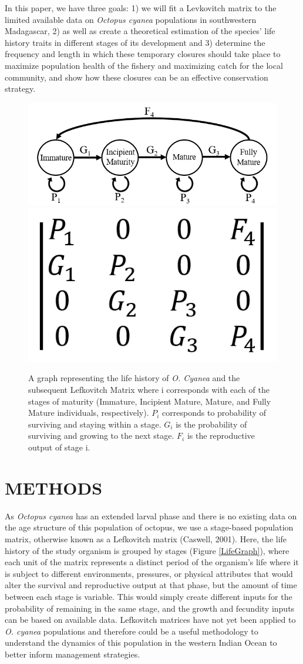 \documentclass[
]{article}
\begin{document}
In this paper, we have three goals: 1) we will fit a Levkovitch matrix to the limited available data on \emph{Octopus cyanea} populations in southwestern Madagascar, 2) as well as create a theoretical estimation of the species' life history traits in different stages of its development and 3) determine the frequency and length in which these temporary closures should take place to maximize population health of the fishery and maximizing catch for the local community, and show how these closures can be an effective conservation strategy.



\begin{figure}
\includegraphics[width=0.45\linewidth]{LifeGraph} \includegraphics[width=0.45\linewidth]{MtxGeneric} \caption{A graph representing the life history of \emph{O. Cyanea} and the subsequent Lefkovitch Matrix where i corresponds with each of the stages of maturity (Immature, Incipient Mature, Mature, and Fully Mature individuals, respectively). \(P_i\) corresponds to probability of surviving and staying within a stage. \(G_i\) is the probability of surviving and growing to the next stage. \(F_i\) is the reproductive output of stage i. \label{LifeGraph}}\label{fig:LifeGraph}
\end{figure}

\hypertarget{methods}{%
\section{METHODS}\label{methods}}

As \emph{Octopus cyanea} has an extended larval phase and there is no existing data on the age structure of this population of octopus, we use a stage-based population matrix, otherwise known as a Lefkovitch matrix (Caswell, 2001). Here, the life history of the study organism is grouped by stages (Figure \ref{LifeGraph}), where each unit of the matrix represents a distinct period of the organism's life where it is subject to different environments, pressures, or physical attributes that would alter the survival and reproductive output at that phase, but the amount of time between each stage is variable. This would simply create different inputs for the probability of remaining in the same stage, and the growth and fecundity inputs can be based on available data. Lefkovitch matrices have not yet been applied to \emph{O. cyanea} populations and therefore could be a useful methodology to understand the dynamics of this population in the western Indian Ocean to better inform management strategies.
\end{document}
